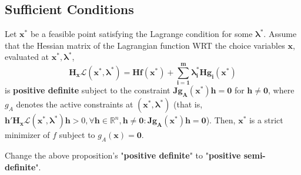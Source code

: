 \subsection{Sufficient Conditions}

\begin{proposition}
    Let $\mathbf{x ^{*}}$ be a feasible point satisfying the Lagrange condition for some $\mathbf{\lambda ^{*}}$. Assume that the Hessian matrix of the Lagrangian function WRT the choice variables $\mathbf{x}$, evaluated at $\boldsymbol{\mathbf{x}^{*},\lambda ^{*}}$,
    \[
        \boldsymbol{\mathbf{H_x}\mathcal{L}(\mathbf{x ^{*}}, \lambda ^{*}) = \mathbf{H}f(\mathbf{x ^{*}}) + \sum_{i=1}^{m} \lambda_i ^{*}\mathbf{H}g_i(\mathbf{x ^{*}})}
    \]
    is \textbf{positive definite} subject to the constraint $\boldsymbol{\mathbf{J}g_A(\mathbf{x ^{*}})\mathbf{h} = \mathbf{0}}$ for $\mathbf{h \neq 0}$, where $g_A$ denotes the active constraints at $(\mathbf{x ^{*}, \boldsymbol{\lambda ^{*}}})$ (that is, $\boldsymbol{\mathbf{h'H_x}\mathcal{L}(\mathbf{x ^{*}}, \lambda ^{*})\mathbf{h}} > 0, \forall \mathbf{h} \in \mathbb{R}^{n}, \mathbf{h \neq 0}: \boldsymbol{\mathbf{J}g_A(\mathbf{x ^{*}})\mathbf{h} = \mathbf{0}}$). Then, $\mathbf{x ^{*}}$ is a strict minimizer of $f$ subject to $g_A(\mathbf{x}) = \mathbf{0}$.
\end{proposition}

\begin{remark*}
    Change the above proposition's "\textbf{positive definite}" to "\textbf{positive semi-definite}".
\end{remark*}

